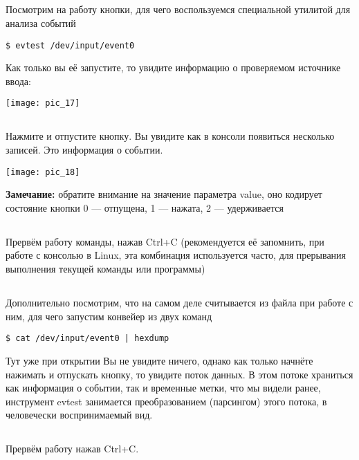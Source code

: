 \subsection{}Посмотрим на работу кнопки, для чего воспользуемся специальной утилитой для анализа событий
\begin{lstlisting}[style=bash]
$ evtest /dev/input/event0  
\end{lstlisting}
Как только вы её запустите, то увидите информацию о проверяемом источнике ввода:
\begin{center}
	\texttt{[image: pic\_17]}
\end{center}

\subsection{}Нажмите и отпустите кнопку. Вы увидите как в консоли появиться несколько записей. Это информация о событии. 
\begin{center}
	\texttt{[image: pic\_18]}
\end{center}
\textbf{Замечание:} обратите внимание на значение параметра value, оно кодирует состояние кнопки 0 — отпущена, 1 — нажата, 2 — удерживается  

\subsection{}Прервём работу команды, нажав Ctrl+C (рекомендуется её запомнить, при работе с консолью в Linux, эта комбинация используется часто, для прерывания выполнения текущей команды или программы)

\subsection{}Дополнительно посмотрим, что на самом деле считывается из файла при работе с ним, для чего запустим конвейер из двух команд
\begin{lstlisting}[style=bash]
$ cat /dev/input/event0 | hexdump 
\end{lstlisting}
Тут уже при открытии Вы не увидите ничего, однако как только начнёте нажимать и отпускать кнопку, то увидите поток данных. В этом потоке храниться как информация о событии, так и временные метки, что мы видели ранее, инструмент evtest занимается преобразованием (парсингом) этого потока, в человечески воспринимаемый вид. 

\subsection{}Прервём работу нажав Ctrl+C.

